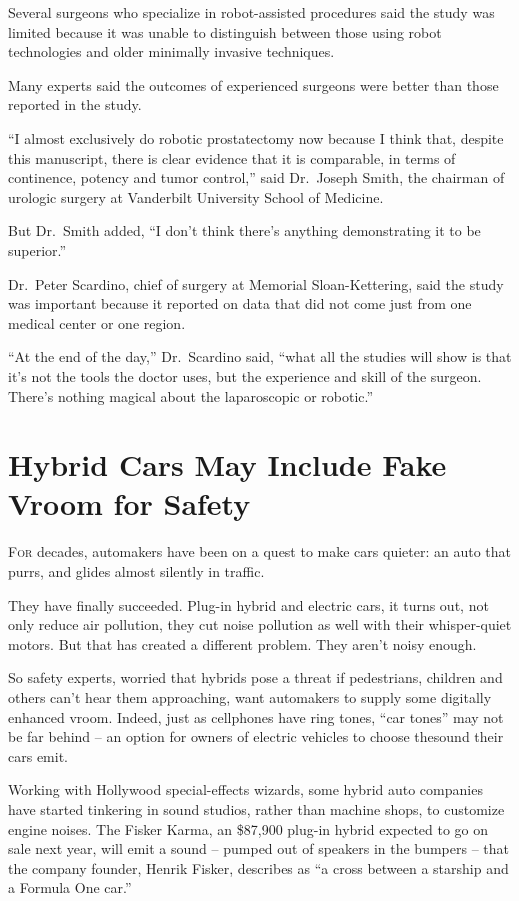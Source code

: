 ﻿\documentclass[12pt]{article}
\begin{document}
Several surgeons who specialize in robot-assisted procedures said the study was limited because it
was unable to distinguish between those using robot technologies and older minimally invasive
techniques.

Many experts said the outcomes of experienced surgeons were better than those reported in the study.

``I almost exclusively do robotic prostatectomy now because I think that, despite this manuscript,
there is clear evidence that it is comparable, in terms of continence, potency and tumor control,''
said Dr.~Joseph Smith, the chairman of urologic surgery at Vanderbilt University School of Medicine.

But Dr.~Smith added, ``I don't think there's anything demonstrating it to be superior.''

Dr.~Peter Scardino, chief of surgery at Memorial Sloan-Kettering, said the study was important
because it reported on data that did not come just from one medical center or one region.

``At the end of the day,'' Dr.~Scardino said, ``what all the studies will show is that it's not the
tools the doctor uses, but the experience and skill of the surgeon. There's nothing magical about
the laparoscopic or robotic.''

\section{Hybrid Cars May Include Fake Vroom for Safety}

\lettrine{F}{or} decades, automakers have been on a quest to make cars
quieter: an auto that purrs, and glides almost silently in traffic.

They have finally succeeded. Plug-in hybrid and electric cars, it turns out, not only reduce air
pollution, they cut noise pollution as well with their whisper-quiet motors. But that has created a
different problem. They aren't noisy enough.

So safety experts, worried that hybrids pose a threat if pedestrians, children and others can't hear
them approaching, want automakers to supply some digitally enhanced vroom. Indeed, just as
cellphones have ring tones, ``car tones'' may not be far behind -- an option for owners of electric
vehicles to choose thesound their cars emit.

Working with Hollywood special-effects wizards, some hybrid auto companies have started tinkering in
sound studios, rather than machine shops, to customize engine noises. The Fisker Karma, an \$87,900
plug-in hybrid expected to go on sale next year, will emit a sound -- pumped out of speakers in the
bumpers -- that the company founder, Henrik Fisker, describes as ``a cross between a starship and a
Formula One car.''
\end{document}
